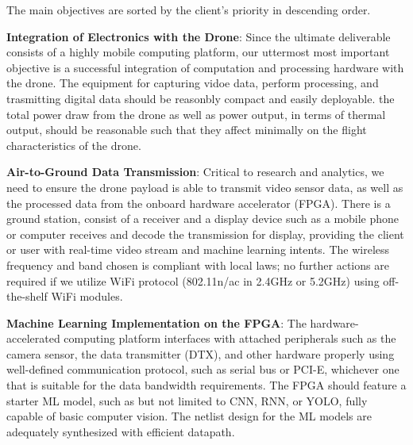 The main objectives are sorted by the client's priority in descending order.

\textbf{Integration of Electronics with the Drone}:
Since the ultimate deliverable consists of a highly mobile computing platform,
our uttermost most important objective is a successful integration of computation and processing hardware with the drone.
The equipment for capturing vidoe data, perform processing, and trasmitting digital data should be reasonbly compact and easily deployable.
the total power draw from the drone as well as power output, in terms of thermal output, should be reasonable such that they affect minimally
on the flight characteristics of the drone.

\textbf{Air-to-Ground Data Transmission}:
Critical to research and analytics, we need to ensure the drone payload is able to transmit video sensor data, as well as the processed data
from the onboard hardware accelerator (FPGA). There is a ground station, consist of a receiver and a display device such as a mobile phone or 
computer receives and decode the transmission for display, providing the client or user with real-time video stream and machine learning intents.
The wireless frequency and band chosen is compliant with local laws; no further actions are required if we utilize WiFi protocol (802.11n/ac in 2.4GHz or 5.2GHz)
using off-the-shelf WiFi modules.

\textbf{Machine Learning Implementation on the FPGA}:
The hardware-accelerated computing platform interfaces with attached peripherals such as the camera sensor, the data transmitter (DTX), and other hardware properly
using well-defined communication protocol, such as serial bus or PCI-E, whichever one that is suitable for the data bandwidth requirements. 
The FPGA should feature a starter ML model, such as but not limited to CNN, RNN, or YOLO, fully capable of basic computer vision.
The netlist design for the ML models are adequately synthesized with efficient datapath.
